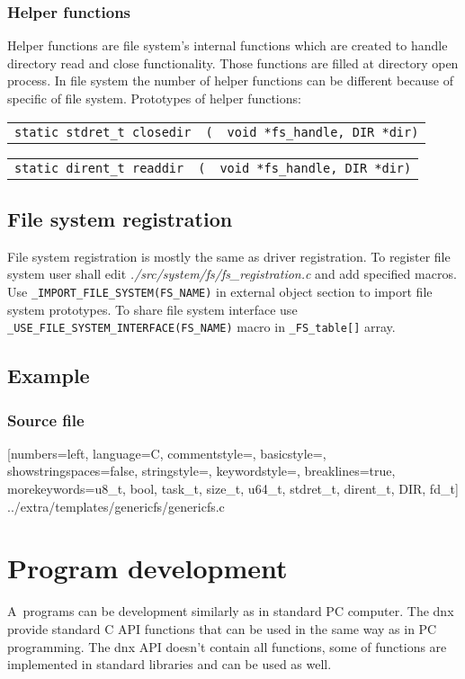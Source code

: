 \documentclass[a4paper,11pt]{report}
\makeatletter
\renewcommand{\path}[1]{\textit{#1}}
\newcommand{\macro}[1]{\texttt{#1}}
\newcommand{\code}[1]{\texttt{#1}}
\newcommand{\includecode}[1]{
    [numbers=left, language=C, commentstyle=\color{commcolor}, basicstyle=\scriptsize\ttfamily,
    showstringspaces=false, stringstyle=\color{stringcolor}, keywordstyle=\color{keywordcolor},
    breaklines=true,
    morekeywords={u8_t, bool, task_t, size_t, u64_t, stdret_t, dirent_t, DIR, fd_t}]
    {#1}}
\newcommand{\prototype}[2]{
   \begin{tabularx}{\textwidth}{@{}l@{}l@{}X}
      \code{#1} & \code{(} & \code{#2)}
   \end{tabularx}
}
\makeatother
\begin{document}
\subsection{Helper functions}
Helper functions are file system's internal functions which are created to handle directory read
and close functionality. Those functions are filled at directory open process. In file system the
number of helper functions can be different because of specific of file system. Prototypes of helper
functions:\\[1ex]
\prototype{static stdret\_t closedir}{void *fs\_handle, DIR *dir}
\prototype{static dirent\_t readdir}{void *fs\_handle, DIR *dir}

\section{File system registration}
File system registration is mostly the same as driver registration. To register file system user
shall edit \path{./src/system/fs/fs\_registration.c} and add specified macros. Use
\macro{\_IMPORT\_FILE\_SYSTEM(FS\_NAME)} in external object section to import file system prototypes.
To share file system interface use \macro{\_USE\_FILE\_SYSTEM\_INTERFACE(FS\_NAME)} macro in
\code{\_FS\_table[]} array.

\section{Example}
\subsection{Source file}
\includecode{../extra/templates/genericfs/genericfs.c}


\chapter{Program development}\label{sec:prog_devel}
A~programs can be development similarly as in standard PC computer. The dnx provide standard C API functions
that can be used in the same way as in PC programming. The dnx API doesn't contain all functions, some
of functions are implemented in standard libraries and can be used as well.
\end{document}
